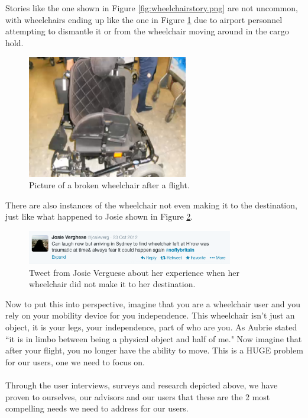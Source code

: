 Stories like the one shown in Figure \ref{fig:wheelchairstory.png} are not uncommon, with wheelchairs ending up like the one in Figure \ref{fig:brokenwheelchair.png} due to airport personnel attempting to dismantle it or from the wheelchair moving around in the cargo hold. 


\begin{figure}[h]
  \centering
     \includegraphics[width=7cm]{images/brokenwheelchair.png}
   \caption{Picture of a broken wheelchair after a flight.}
  \label{fig:brokenwheelchair.png}
\end{figure}

There are also instances of the wheelchair not even making it to the destination, just like what happened to Josie shown in Figure \ref{fig:leftwheelchair.png}. 

\begin{figure}[h]
  \centering
     \includegraphics[width=9cm]{images/leftwheelchair.png}
   \caption{Tweet from Josie Verguese about her experience when her wheelchair did not make it to her destination.}
  \label{fig:leftwheelchair.png}
\end{figure}

Now to put this into perspective, imagine that you are a wheelchair user and you rely on your mobility device for you independence. This wheelchair isn't just an object, it is your legs, your independence, part of who are you. As Aubrie stated ``it is in limbo between being a physical object and half of me." Now imagine that after your flight, you no longer have the ability to move. This is a HUGE problem for our users, one we need to focus on. \\
\\


 Through  the user interviews, surveys and research depicted above, we have proven to ourselves, our advisors and our users that these are the 2 most compelling needs we need to address for our users. 



